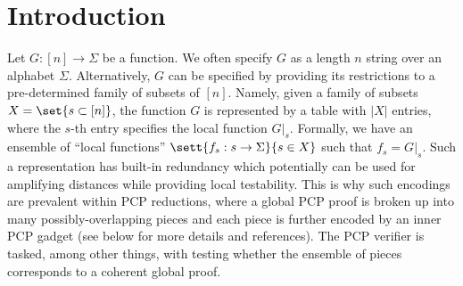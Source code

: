 \documentclass{article}[11pt]
\begin{document}

\newpage
\tableofcontents
    
\newpage\pagestyle{plain}
\setcounter{page}{1}

\section{Introduction}
Let $G:[n]\to\Sigma$ be a function. We often specify $G$ as a length $n$ string over an alphabet $\Sigma$. Alternatively, $G$ can be specified by providing its restrictions to a pre-determined family of subsets of $[n]$. Namely, given a family of subsets $X= \set{s\subset [n]}$, the function $G$ is represented by a table with $|X|$ entries, where the $s$-th entry specifies the local function $G|_s$. Formally, we have  an ensemble of ``local functions'' $\sett{f_s:s\to\Sigma}{s\in X}$ such that $f_s = G|_s$. Such a representation has built-in redundancy which  potentially can be used for amplifying distances while providing local testability. This is why such encodings are prevalent within PCP reductions, where a global PCP proof is broken up into many possibly-overlapping pieces and each piece is further encoded by an inner PCP gadget (see below for more details and references). The PCP verifier is tasked, among other things, with testing whether the ensemble of pieces corresponds to a coherent global proof. 
\end{document}
